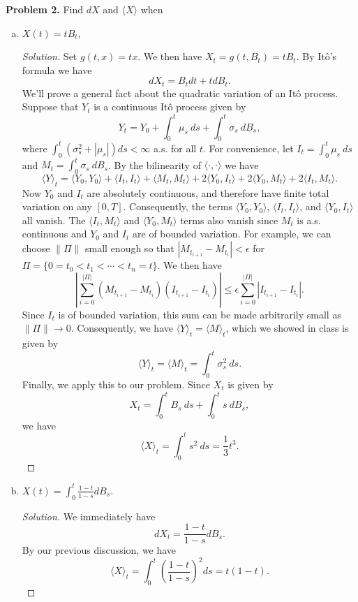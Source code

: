 \documentclass[11pt,letterpaper]{report}
\newenvironment{solution}
{\begin{proof}[Solution]}
{\end{proof}}
\begin{document}
\noindent\textbf{Problem 2. }Find $dX$ and $\langle X\rangle$ when
\begin{enumerate}[a)]
	\item $X(t) = tB_t$,
	\begin{solution}
		Set $g(t, x) = tx$. We then have $X_t = g(t, B_t) = tB_t$. By It\^o's formula we have
		\[
		dX_t = B_tdt + tdB_t.
		\]
		We'll prove a general fact about the quadratic variation of an It\^o process. Suppose that $Y_t$ is a continuous It\^o process given by
		\[
		Y_t = Y_0 + \int_0^t\mu_s\ ds + \int_0^t\sigma_s\ dB_s,
		\]
		where $\int_0^t(\sigma^2_s + |\mu_s|)ds < \infty$ a.s. for all $t$. For convenience, let $I_t = \int_0^t \mu_s\ ds$ and $M_t = \int_0^t\sigma_s\ dB_s$. By the bilinearity of $\langle \cdot , \cdot \rangle$ we have
		\[
		\langle Y\rangle_t = \langle Y_0, Y_0\rangle  + \langle I_t, I_t\rangle + \langle M_t, M_t\rangle + 2\langle Y_0, I_t\rangle + 2\langle Y_0, M_t\rangle + 2\langle I_t, M_t\rangle.
		\]
		Now $Y_0$ and $I_t$ are absolutely continuous, and therefore have finite total variation on any $[0, T]$. Consequently, the terms $\langle Y_0, Y_0\rangle$, $\langle I_t, I_t\rangle$, and $\langle Y_0, I_t\rangle$ all vanish. The $\langle I_t, M_t\rangle$ and $\langle Y_0, M_t\rangle$ terms also vanish since $M_t$ is a.s. continuous and $Y_0$ and $I_t$ are of bounded variation. For example, we can choose $\|\Pi\|$ small enough so that $|M_{t_{i+1}} - M_{t_i}|<\epsilon$ for $\Pi = \{0 = t_0<t_1 < \cdots < t_n=t\}$. We then have
		\[
		 \left|\sum_{i=0}^{|\Pi|}(M_{t_{i+1}}- M_{t_i})(I_{t_{i+1}}-I_{t_i})\right|\leq \epsilon\sum_{i=0}^{|\Pi|}|I_{t_{i+1}}-I_{t_i}|.
		\] 
		Since $I_t$ is of bounded variation, this sum can be made arbitrarily small as $\|\Pi\|\to 0$. Consequently, we have $\langle Y\rangle_t= \langle M\rangle_t$, which we showed in class is given by
		\[
		\langle Y\rangle_t = \langle M\rangle_t = \int_0^t\sigma^2_s\ ds.
		\]
		Finally, we apply this to our problem. Since $X_t$ is given by
		\[
		X_t = \int_0^tB_s\ ds + \int_0^ts\ dB_s,
		\]
		we have
		\[
		\langle X\rangle_t = \int_0^ts^2\ ds = \frac{1}{3}t^3.
		\]
	\end{solution}
	\item $X(t) = \int_0^t\frac{1-t}{1-s}dB_s$.
	\begin{solution}
		We immediately have
		\[
		dX_t = \frac{1-t}{1-s}dB_s.
		\]
		By our previous discussion, we have
		\[
		\langle X\rangle_t = \int_0^t\left(\frac{1-t}{1-s}\right)^2ds = t(1-t).
		\]
	\end{solution}
\end{enumerate}
\end{document}

